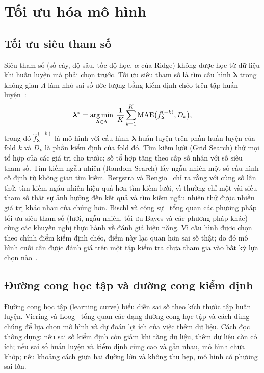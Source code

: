 \section{Tối ưu hóa mô hình}
\label{sec:opt_theory}

\subsection{Tối ưu siêu tham số}
Siêu tham số (số cây, độ sâu, tốc độ học, $\alpha$ của Ridge) không được học từ dữ liệu khi huấn luyện mà phải chọn trước. Tối ưu siêu tham số là tìm cấu hình $\boldsymbol{\lambda}$ trong không gian $\Lambda$ làm nhỏ sai số ước lượng bằng kiểm định chéo trên tập huấn luyện~\cite{bischl2023hyperparameter}:
\begin{equation}
    \boldsymbol{\lambda}^{*} = \operatorname*{arg\,min}_{\boldsymbol{\lambda} \in \Lambda} \; \frac{1}{K}\sum_{k=1}^{K} \mathrm{MAE}\big(\hat{f}_{\boldsymbol{\lambda}}^{(-k)}, D_k\big),
    \label{eq:hpo}
\end{equation}
trong đó $\hat{f}_{\boldsymbol{\lambda}}^{(-k)}$ là mô hình với cấu hình $\boldsymbol{\lambda}$ huấn luyện trên phần huấn luyện của fold $k$ và $D_k$ là phần kiểm định của fold đó. Tìm kiếm lưới (Grid Search) thử mọi tổ hợp của các giá trị cho trước; số tổ hợp tăng theo cấp số nhân với số siêu tham số. Tìm kiếm ngẫu nhiên (Random Search) lấy ngẫu nhiên một số cấu hình cố định từ không gian tìm kiếm. Bergstra và Bengio~\cite{bergstra2012random} chỉ ra rằng với cùng số lần thử, tìm kiếm ngẫu nhiên hiệu quả hơn tìm kiếm lưới, vì thường chỉ một vài siêu tham số thật sự ảnh hưởng đến kết quả và tìm kiếm ngẫu nhiên thử được nhiều giá trị khác nhau của chúng hơn. Bischl và cộng sự~\cite{bischl2023hyperparameter} tổng quan các phương pháp tối ưu siêu tham số (lưới, ngẫu nhiên, tối ưu Bayes và các phương pháp khác) cùng các khuyến nghị thực hành về đánh giá hiệu năng. Vì cấu hình được chọn theo chính điểm kiểm định chéo, điểm này lạc quan hơn sai số thật; do đó mô hình cuối cần được đánh giá trên một tập kiểm tra chưa tham gia vào bất kỳ lựa chọn nào~\cite{hastie2009elements}.

\subsection{Đường cong học tập và đường cong kiểm định}
Đường cong học tập (learning curve) biểu diễn sai số theo kích thước tập huấn luyện. Viering và Loog~\cite{viering2023shape} tổng quan các dạng đường cong học tập và cách dùng chúng để lựa chọn mô hình và dự đoán lợi ích của việc thêm dữ liệu. Cách đọc thông dụng: nếu sai số kiểm định còn giảm khi tăng dữ liệu, thêm dữ liệu còn có ích; nếu sai số huấn luyện và kiểm định cùng cao và gần nhau, mô hình chưa khớp; nếu khoảng cách giữa hai đường lớn và không thu hẹp, mô hình có phương sai lớn.

